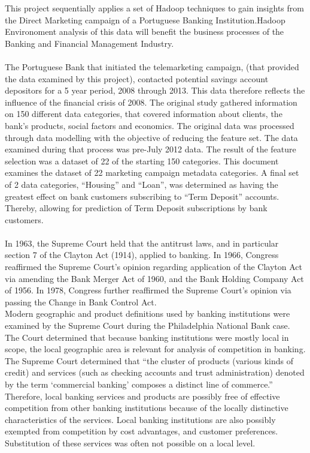 This project sequentially applies a set of Hadoop techniques to gain insights from the Direct Marketing campaign of a Portuguese Banking Institution.Hadoop Environoment analysis of this data will benefit the business processes of the Banking and Financial Management Industry. \\
\\
The Portuguese Bank that initiated the telemarketing campaign, (that provided the data examined by this project), contacted potential savings account depositors for a 5 year period, 2008 through 2013. This data therefore reflects the influence of the financial crisis of 2008. The original study gathered information on 150 different data categories, that covered information about clients, the bank’s products, social factors and economics. The original data was processed through data modelling with the objective of reducing the feature set. The data examined during that process was pre-July 2012 data. The result of the feature selection was a dataset of 22 of the starting 150 categories. This document examines the dataset of 22 marketing campaign metadata categories. A final set of 2 data categories, “Housing” and “Loan”, was determined as having the greatest effect on bank customers subscribing to “Term Deposit” accounts. Thereby, allowing for prediction of Term Deposit subscriptions by bank customers.\\
\\
In 1963, the Supreme Court held that the antitrust laws, and in particular section 7 of the Clayton Act (1914), applied to banking. In 1966, Congress reaffirmed the Supreme Court’s opinion regarding application of the Clayton Act via amending the Bank Merger Act of 1960, and the Bank Holding Company Act of 1956. In 1978, Congress further reaffirmed the Supreme Court’s opinion via passing the Change in Bank Control Act.
\\
Modern geographic and product definitions used by banking institutions were examined by the Supreme Court during the Philadelphia National Bank case. The Court determined that because banking institutions were mostly local in scope, the local geographic area is relevant for analysis of competition in banking. The Supreme Court determined that “the cluster of products (various kinds of credit) and services (such as checking accounts and trust administration) denoted by the term ‘commercial banking’ composes a distinct line of commerce.” Therefore, local banking services and products are possibly free of effective competition from other banking institutions because of the locally distinctive characteristics of the services. Local banking institutions are also possibly exempted from competition by cost advantages, and customer preferences. Substitution of these services was often not possible on a local level.\\
